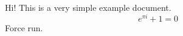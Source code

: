 \documentclass{article}
\begin{document}
Hi! This is a very simple example document.
\[e^{\pi i} + 1 = 0\]
Force run.
\end{document}
